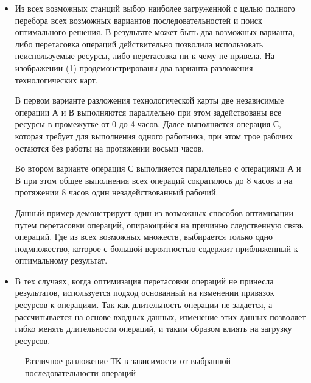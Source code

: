 \begin{itemize}
    \item Из всех возможных станций выбор наиболее загруженной с целью полного перебора всех возможных вариантов последовательностей и поиск оптимального решения. В результате может быть два возможных варианта, либо перетасовка операций действительно позволила использовать неиспользуемые ресурсы, либо перетасовка ни к чему не привела. На изображении (\ref{ris:DecompositionOfTk}) продемонстрированы два варианта разложения технологических карт. 
    
    В первом варианте разложения технологической карты две независимые операции А и В выполняются параллельно при этом задействованы все ресурсы в промежутке от 0 до 4 часов. Далее выполняется операция С, которая требует для выполнения одного работника, при этом трое рабочих остаются без работы на протяжении восьми часов.
    
    Во втором варианте операция С выполняется параллельно с операциями А и В при этом общее выполнения всех операций сократилось до 8 часов и на протяжении 8 часов один незадействованный рабочий.
    
    Данный пример демонстрирует один из возможных способов оптимизации путем перетасовки операций, опирающийся на причинно следственную связь операций.  Где из всех возможных множеств, выбирается только одно подмножество, которое с большой вероятностью содержит приближенный к оптимальному результат.
    
    \item В тех случаях, когда оптимизация перетасовки операций не принесла результатов, используется подход основанный на изменении привязок ресурсов к операциям. Так как длительность операции не задается, а рассчитывается на основе входных данных, изменение этих данных позволяет гибко менять длительности операций, и таким образом влиять на загрузку ресурсов. 

\end{itemize}

\begin{figure}[H]
    \caption{Различное разложение ТК в зависимости от выбранной последовательности операций}
    \label{ris:DecompositionOfTk}
\end{figure}

